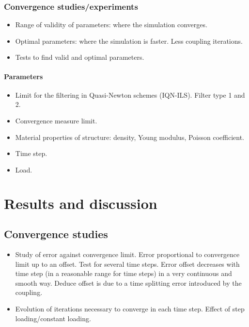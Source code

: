 \documentclass[a4paper, 11pt, oneside]{Thesis}  %
\begin{document}
        \subsection{Convergence studies/experiments}
            \begin{itemize}
                \item Range of validity of parameters: where the simulation converges.
                \item Optimal parameters: where the simulation is faster. Less coupling iterations.
                \item Tests to find valid and optimal parameters.
            \end{itemize}
            \subsubsection{Parameters}
                \begin{itemize}
                    \item Limit for the filtering in Quasi-Newton schemes (IQN-ILS). Filter type 1 and 2.
                    \item Convergence measure limit.
                    \item Material properties of structure: density, Young modulus, Poisson coefficient.
                    \item Time step.
                    \item Load.
                \end{itemize}

\chapter{Results and discussion}

    \section{Convergence studies}
   
        \begin{itemize}
            \item Study of error against convergence limit. Error proportional to convergence limit up to an offset. Test for several time steps. Error offset decreases with time step (in a reasonable range for time steps) in a very continuous and smooth way. Deduce offset is due to a time splitting error introduced by the coupling.
            \item Evolution of iterations necessary to converge in each time step. Effect of step loading/constant loading.
        \end{itemize}
\end{document}
